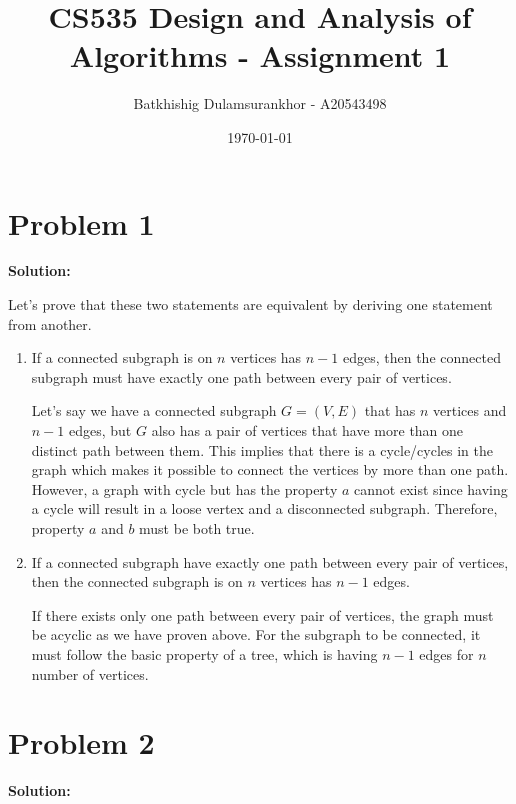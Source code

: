 \documentclass{article}
\title{CS535 Design and Analysis of Algorithms - Assignment 1}
\author{Batkhishig Dulamsurankhor - A20543498}
\date{\today} %
\begin{document}
\maketitle

\section*{Problem 1}
\textbf{Solution:}

Let's prove that these two statements are equivalent by deriving one statement from another.

\begin{enumerate}
  \item If a connected subgraph is on $n$ vertices has $n-1$ edges, then the connected subgraph must have exactly one path between every pair of vertices.

  Let's say we have a connected subgraph $G=(V,E)$ that has $n$ vertices and $n-1$ edges, but $G$ also has a pair of vertices that have more than one distinct path between them. This implies that there is a cycle/cycles in the graph which makes it possible to connect the vertices by more than one path. However, a graph with cycle but has the property $a$ cannot exist since having a cycle will result in a loose vertex and a disconnected subgraph. Therefore, property $a$ and $b$ must be both true.

  \item If a connected subgraph have exactly one path between every pair of vertices, then the connected subgraph is on $n$ vertices has $n-1$ edges.

  If there exists only one path between every pair of vertices, the graph must be acyclic as we have proven above. For the subgraph to be connected, it must follow the basic property of a tree, which is having $n-1$ edges for $n$ number of vertices.
\end{enumerate}



\section*{Problem 2}
\textbf{Solution:}
\end{document}
